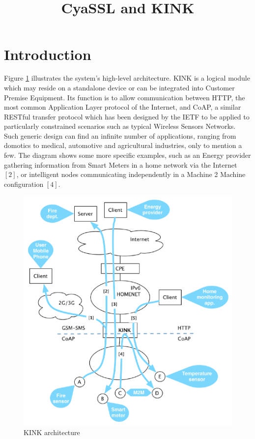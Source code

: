 \documentclass[10pt]{article}
\title{\textbf{CyaSSL and KINK}}
\author{}
\date{}
\begin{document}
\maketitle

\section{Introduction}

Figure \ref{fig:arch} illustrates the system's high-level architecture. KINK is a logical module which may reside on a standalone device or can be integrated into Customer Premise Equipment. Its function is to allow communication between HTTP, the most common Application Layer protocol of the Internet, and CoAP, a similar RESTful transfer protocol which has been designed by the IETF to be applied to particularly constrained scenarios such as typical Wireless Sensors Networks. Such generic design can find an infinite number of applications, ranging from domotics to medical, automotive and agricultural industries, only to mention a few. The diagram shows some more specific examples, such as an Energy provider gathering information from Smart Meters in a home network via the Internet $[2]$, or intelligent nodes communicating independently in a Machine 2 Machine configuration $[4]$.

\begin{center}
    \begin{figure}
        \includegraphics[width=14cm]{../share/images/kink-homenet}
            \caption{KINK architecture}
            \label{fig:arch}
    \end{figure}
\end{center}
\end{document}
